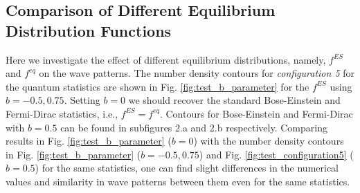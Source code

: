 \documentclass{rsproca}%
\begin{document}
\subsection{Comparison of Different Equilibrium Distribution Functions}

Here we investigate the effect of different equilibrium distributions, namely, $f^{ES}$ and $f^{eq}$ on the wave patterns. The number density contours for \emph{configuration 5} for the quantum statistics are shown in Fig. \ref{fig:test_b_parameter} for the $f^{ES}$ using $b=-0.5,0.75$. Setting $b=0$ we should recover the standard Bose-Einstein and Fermi-Dirac statistics, i.e., $f^{ES}= f^{eq}$. Contours for Bose-Einstein and Fermi-Dirac with $b=0.5$ can be found in subfigures 2.a and 2.b respectively. Comparing results in Fig. \ref{fig:test_b_parameter} ($b=0$) with the number density contours in Fig. \ref{fig:test_b_parameter} ($b=-0.5,0.75$) and Fig. \ref{fig:test_configuration5} ($b=0.5$) for the same statistics, one can find slight differences in the numerical values and similarity in wave patterns between them even for the same statistics.
\end{document}
